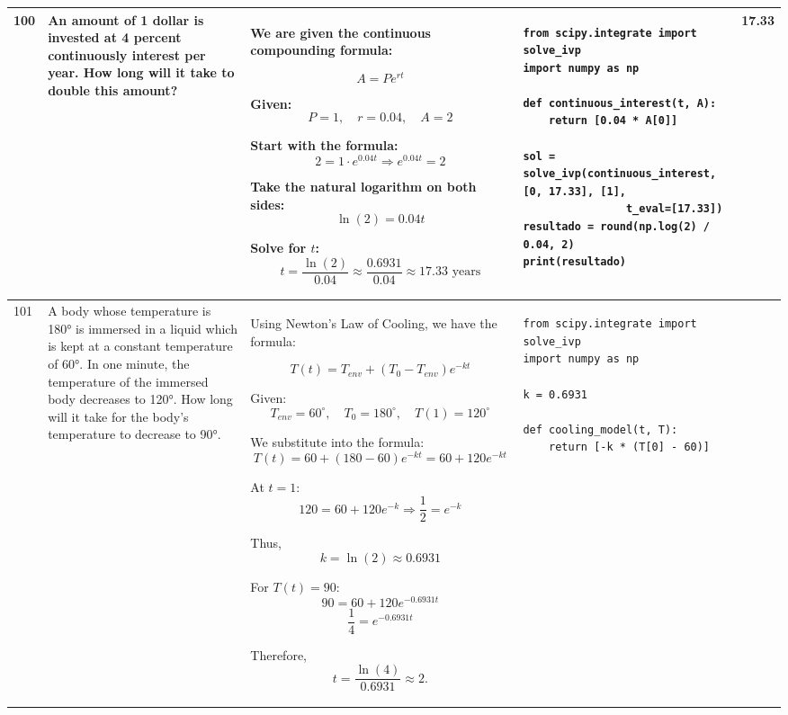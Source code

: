 \documentclass[a4paper,12pt]{article}
\begin{document}
\begin{longtable}{|p{0.3cm}|p{}|p{10cm}|p{}|p{1.5cm}|}
100 & An amount of 1 dollar is invested at 4 percent continuously interest per year. How long will it take to double this amount? &
We are given the continuous compounding formula:

\[
A = Pe^{rt}
\]

Given:
\[
P = 1, \quad r = 0.04, \quad A = 2
\]

Start with the formula:
\[
2 = 1 \cdot e^{0.04t} \Rightarrow e^{0.04t} = 2
\]

Take the natural logarithm on both sides:
\[
\ln(2) = 0.04t
\]

Solve for \(t\):
\[
t = \frac{\ln(2)}{0.04} \approx \frac{0.6931}{0.04} \approx 17.33 \text{ years}
\] &
\begin{verbatim}
from scipy.integrate import solve_ivp
import numpy as np

def continuous_interest(t, A):
    return [0.04 * A[0]]

sol = solve_ivp(continuous_interest, [0, 17.33], [1],
                t_eval=[17.33])
resultado = round(np.log(2) / 0.04, 2)
print(resultado)
\end{verbatim}
& 17.33 \\ \hline

101 & A body whose temperature is 180° is immersed in a liquid which is kept at a constant temperature of 60°. In one minute, the temperature of the immersed body decreases to 120°. How long will it take for the body's temperature to decrease to 90°. &
Using Newton's Law of Cooling, we have the formula:

\[T(t) = T_{env} + (T_0 - T_{env}) e^{-kt}\]

Given:
\[T_{env} = 60^\circ, \quad T_0 = 180^\circ, \quad T(1) = 120^\circ\]

We substitute into the formula:
\[T(t) = 60 + (180 - 60)e^{-kt} = 60 + 120e^{-kt}\]

At \(t=1\):
\[120 = 60 + 120e^{-k} \Rightarrow \frac{1}{2} = e^{-k}\]

Thus,
\[k = \ln(2) \approx 0.6931\]

For \(T(t)=90\):
\[90 = 60 + 120e^{-0.6931t}\]
\[
\frac{1}{4} = e^{-0.6931t}
\]

Therefore,
\[
t = \frac{\ln(4)}{0.6931} \approx 2.
\] &
\begin{verbatim}
from scipy.integrate import solve_ivp
import numpy as np

k = 0.6931

def cooling_model(t, T):
    return [-k * (T[0] - 60)]


\end{verbatim}
\end{longtable}
\end{document}
